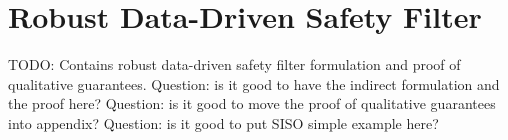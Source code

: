 \chapter{Robust Data-Driven Safety Filter}\label{chap:robust-ddsf-lti}
TODO: Contains robust data-driven safety filter formulation and proof of qualitative guarantees.
Question: is it good to have the indirect formulation and the proof here?
Question: is it good to move the proof of qualitative guarantees into appendix?
Question: is it good to put SISO simple example here?